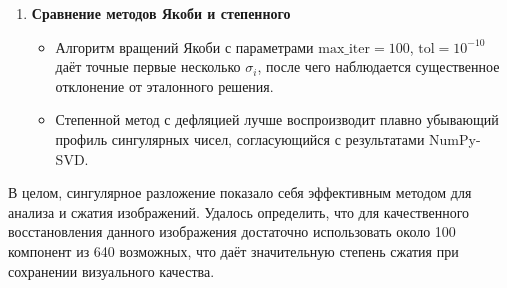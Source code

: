 \documentclass[a4paper,12pt]{article}
\begin{document}
\begin{enumerate}
    \item \textbf{Сравнение методов Якоби и степенного}
    \begin{itemize}
        \item Алгоритм вращений Якоби с параметрами $\text{max\_iter}=100$, $\text{tol}=10^{-10}$ даёт точные первые несколько $\sigma_i$, после чего наблюдается существенное отклонение от эталонного решения.
        \item Степенной метод с дефляцией лучше воспроизводит плавно убывающий профиль сингулярных чисел, согласующийся с результатами NumPy-SVD.
    \end{itemize}
\end{enumerate}

В целом, сингулярное разложение показало себя эффективным методом для анализа и сжатия изображений. Удалось определить, что для качественного восстановления данного изображения достаточно использовать около 100 компонент из 640 возможных, что даёт значительную степень сжатия при сохранении визуального качества.
\end{document}
